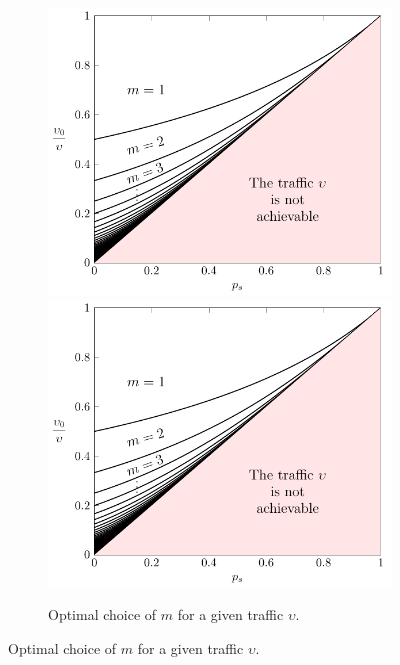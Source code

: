 \begin{figure}[htb]
\centering
    \begin{subfigure}[t]{.45\textwidth}
      \centering
        \if{}
            \includegraphics[width=\columnwidth]{Figures/Ch6_opt_m.pdf}
        \else
            \includegraphics[draft, width=\columnwidth]{Figures/Ch6_opt_m.pdf}
        \fi
        \caption{Optimal choice of $m$ for a given traffic $\upsilon$.}
        \label{fig:opt_m}
    \end{subfigure}%

\end{figure}
